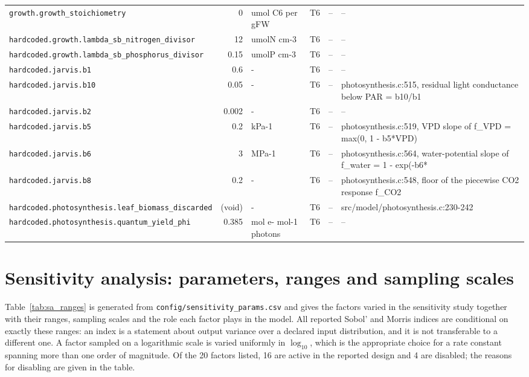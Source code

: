 \begin{table}[!htbp]
\begin{tabular}{@{}p{52mm}rp{20mm}cp{20mm}p{38mm}@{}}
\texttt{growth.growth\_stoichiometry} & 0 & umol C6 per gFW & T6 & -- & -- \\
\texttt{hardcoded.growth.lambda\_sb\_nitrogen\_divisor} & 12 & umolN cm-3 & T6 & -- & -- \\
\texttt{hardcoded.growth.lambda\_sb\_phosphorus\_divisor} & 0.15 & umolP cm-3 & T6 & -- & -- \\
\texttt{hardcoded.jarvis.b1} & 0.6 & - & T6 & -- & -- \\
\texttt{hardcoded.jarvis.b10} & 0.05 & - & T6 & -- & photosynthesis.c:515, residual light conductance below PAR = b10/b1 \\
\texttt{hardcoded.jarvis.b2} & 0.002 & - & T6 & -- & -- \\
\texttt{hardcoded.jarvis.b5} & 0.2 & kPa-1 & T6 & -- & photosynthesis.c:519, VPD slope of f\_VPD = max(0, 1 - b5*VPD) \\
\texttt{hardcoded.jarvis.b6} & 3 & MPa-1 & T6 & -- & photosynthesis.c:564, water-potential slope of f\_water = 1 - exp(-b6* \\
\texttt{hardcoded.jarvis.b8} & 0.2 & - & T6 & -- & photosynthesis.c:548, floor of the piecewise CO2 response f\_CO2 \\
\texttt{hardcoded.photosynthesis.leaf\_biomass\_discarded} & (void) & - & T6 & -- & src/model/photosynthesis.c:230-242 \\
\texttt{hardcoded.photosynthesis.quantum\_yield\_phi} & 0.385 & mol e- mol-1 photons & T6 & -- & -- \\
\bottomrule
\end{tabular}
\end{table}

\section{Sensitivity analysis: parameters, ranges and sampling scales}
\label{app:sa}

Table~\ref{tab:sa_ranges} is generated from
\texttt{config/sensitivity\_params.csv} and gives the factors varied in the
sensitivity study together with their ranges, sampling scales and the role each
factor plays in the model. All reported Sobol' and Morris indices are conditional
on exactly these ranges: an index is a statement about output variance over a
declared input distribution, and it is not transferable to a different one. A
factor sampled on a logarithmic scale is varied uniformly in $\log_{10}$, which
is the appropriate choice for a rate constant spanning more than one order of
magnitude. Of the 20 factors listed, 16 are active in the reported design and 4
are disabled; the reasons for disabling are given in the table.

